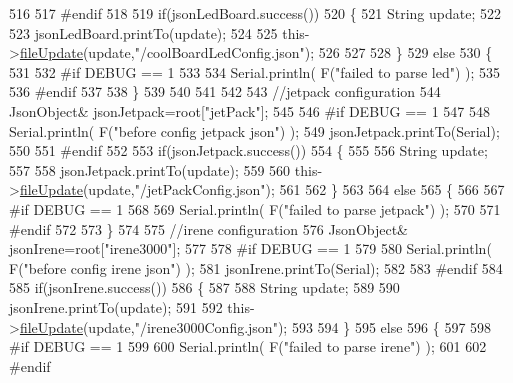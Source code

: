 \begin{DoxyCode}
516 
517 \textcolor{preprocessor}{#endif}
518 
519     \textcolor{keywordflow}{if}(jsonLedBoard.success())
520     \{   
521         String update;
522     
523         jsonLedBoard.printTo(update);
524 
525         this->\hyperlink{class_cool_file_system_a13f2958f5b87757c31fc53797a30d23a}{fileUpdate}(update,\textcolor{stringliteral}{"/coolBoardLedConfig.json"});      
526 
527     
528     \}
529     \textcolor{keywordflow}{else}
530     \{
531     
532 \textcolor{preprocessor}{    #if DEBUG == 1 }
533 
534         Serial.println( F(\textcolor{stringliteral}{"failed to parse led"}) );
535     
536 \textcolor{preprocessor}{    #endif }
537 
538     \}
539         
540 
541     
542 
543     \textcolor{comment}{//jetpack configuration}
544         JsonObject& jsonJetpack=root[\textcolor{stringliteral}{"jetPack"}];
545 
546 \textcolor{preprocessor}{#if DEBUG == 1 }
547 
548     Serial.println( F(\textcolor{stringliteral}{"before config jetpack json"}) );
549     jsonJetpack.printTo(Serial);
550 
551 \textcolor{preprocessor}{#endif}
552 
553     \textcolor{keywordflow}{if}(jsonJetpack.success())
554     \{
555     
556         String update;
557     
558         jsonJetpack.printTo(update);
559 
560         this->\hyperlink{class_cool_file_system_a13f2958f5b87757c31fc53797a30d23a}{fileUpdate}(update,\textcolor{stringliteral}{"/jetPackConfig.json"});       
561 
562     \}
563 
564     \textcolor{keywordflow}{else}
565     \{
566     
567 \textcolor{preprocessor}{    #if DEBUG == 1 }
568 
569         Serial.println( F(\textcolor{stringliteral}{"failed to parse jetpack"}) ); 
570     
571 \textcolor{preprocessor}{    #endif}
572 
573     \}
574     
575     \textcolor{comment}{//irene configuration   }
576         JsonObject& jsonIrene=root[\textcolor{stringliteral}{"irene3000"}];
577     
578 \textcolor{preprocessor}{#if DEBUG == 1 }
579 
580     Serial.println( F(\textcolor{stringliteral}{"before config irene json"}) );    
581     jsonIrene.printTo(Serial);
582 
583 \textcolor{preprocessor}{#endif }
584 
585     \textcolor{keywordflow}{if}(jsonIrene.success())
586     \{
587 
588         String update;
589     
590         jsonIrene.printTo(update);
591 
592         this->\hyperlink{class_cool_file_system_a13f2958f5b87757c31fc53797a30d23a}{fileUpdate}(update,\textcolor{stringliteral}{"/irene3000Config.json"});     
593     
594     \}
595     \textcolor{keywordflow}{else}
596     \{
597     
598 \textcolor{preprocessor}{    #if DEBUG == 1 }
599 
600         Serial.println( F(\textcolor{stringliteral}{"failed to parse irene"}) );   
601     
602 \textcolor{preprocessor}{    #endif }

\end{DoxyCode}
